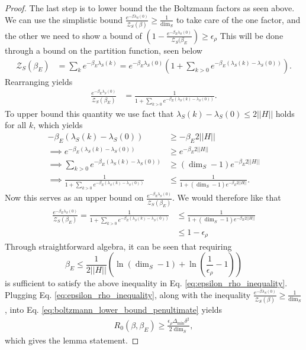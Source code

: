 \documentclass{article}
\newcommand{\parens}[1]{\left( #1 \right)}
\newcommand{\norm}[1]{\left| \left| #1 \right| \right|}
\newcommand{\partfun}{\mathcal{Z}}
\begin{document}
\begin{proof}
    The last step is to lower bound the the Boltzmann factors as seen above. We can use the simplistic bound $\frac{e^{-\beta \lambda_S(0)}}{\partfun_S(\beta)} \geq \frac{1}{\dim_S}$ to take care of the one factor, and the other we need to show a bound of $\parens{1 - \frac{e^{-\beta_E \lambda_S(0)}}{\partfun_S(\beta_E}} \geq \epsilon_{\rho}$
    This will be done through a bound on the partition function, seen below
    \begin{align}
        \partfun_S(\beta_E) &=  \sum_k e^{-\beta_E \lambda_S(k)} = e^{-\beta_E \lambda_S(0)} \parens{1 + \sum_{k > 0} e^{-\beta_E (\lambda_S(k) - \lambda_S(0))}}.
    \end{align}
    Rearranging yields
    \begin{align}
        \frac{e^{-\beta_E \lambda_S(0)}}{\partfun_S(\beta_E)} &= \frac{1}{1 + \sum_{k > 0} e^{-\beta_E (\lambda_S(k) - \lambda_S(0))}}.
    \end{align}
    To upper bound this quantity we use fact that $\lambda_S(k) - \lambda_S(0) \leq 2 \norm{H}$ holds for all $k$, which yields
    \begin{align}
        -\beta_E(\lambda_S(k) - \lambda_S(0)) &\geq -\beta_E 2 \norm{H} \\
        \implies e^{-\beta_E (\lambda_S(k) - \lambda_S(0))} &\geq e^{-\beta_E 2 \norm{H}} \\
        \implies \sum_{k > 0} e^{-\beta_E (\lambda_S(k) - \lambda_S(0))} &\geq (\dim_S - 1) e^{-\beta_E 2 \norm{H}} \\
        \implies \frac{1}{1 + \sum_{k > 0} e^{-\beta_E (\lambda_S(k) - \lambda_S(0))} } &\leq \frac{1} {1 + (\dim_S - 1) e^{-\beta_E 2 \norm{H}} } .
    \end{align}
    Now this serves as an upper bound on $\frac{e^{-\beta_E \lambda_S(0)}}{\partfun_S(\beta_E)}$. We would therefore like that 
    \begin{align}
        \frac{e^{-\beta_E \lambda_S(0)}}{\partfun_S(\beta_E)} = \frac{1}{1 + \sum_{k > 0} e^{-\beta_E (\lambda_S(k) - \lambda_S(0))}} &\leq \frac{1}{1 + (\dim_S - 1) e^{-\beta_E 2 \norm{H}}} \\
        &\leq 1 - \epsilon_{\rho} \label{eq:epsilon_rho_inequality}
    \end{align}
    Through straightforward algebra, it can be seen that requiring 
    \begin{equation}
        \beta_E \leq \frac{1}{2 \norm{H}} \parens{\ln (\dim_S - 1) + \ln \left( \frac{1}{\epsilon_{\rho}} - 1\right) } \label{eq:beta_e_upper_bound_thermal_diffs}
    \end{equation}
    is sufficient to satisfy the above inequality in Eq. \eqref{eq:epsilon_rho_inequality}. Plugging Eq. \eqref{eq:epsilon_rho_inequality}, along with the inequality $\frac{e^{-\beta \lambda_S(0)}}{\partfun_S(\beta)} \geq \frac{1}{\dim_S}$, into Eq. \eqref{eq:boltzmann_lower_bound_penultimate} yields
    \begin{align}
        R_0(\beta, \beta_E) \geq \frac{\epsilon_{\rho} \Delta_{\min} \delta^2}{2 \dim_S},
    \end{align}
    which gives the lemma statement. 


\end{proof}
\end{document}
